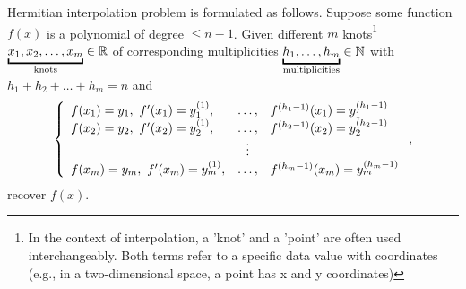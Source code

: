 Hermitian interpolation problem is formulated as follows. Suppose  some function $f(x)$ is a polynomial of degree $\leq n-1$. Given different $m$ knots\footnote{In the context of interpolation, a 'knot' and a 'point' are often used interchangeably. Both terms refer to a specific data value with coordinates (e.g., in a two-dimensional space, a point has x and y coordinates)} $\underbracket{x_1, x_2, \ldots, x_m}_{\text{knots}} \in \R$ of corresponding multiplicities $\underbracket{h_1, \ldots, h_m}_{\text{multiplicities}} \in \N$ with $h_1 + h_2 + \ldots + h_m = n$ and
    \[
        \left\{ 
        \begin{array}{l c l}         
            f(x_1) = y_1, \ f'(x_1) = y_1^{(1)},  &\ldots,&  f^{(h_1-1)}(x_1)=y_1^{(h_1-1)} \\
            f(x_2) = y_2, \ f'(x_2) = y_2^{(1)}, &\ldots,& f^{(h_2-1)}(x_2)=y_2^{(h_2-1)} \\
            &\vdots& \\
            f(x_m) = y_m, \ f'(x_m) = y_m^{(1)},&\ldots,& f^{(h_m-1)}(x_m) = y_m^{(h_m-1)}
        \end{array}
        \right.,
    \]
recover $f(x)$.
 
